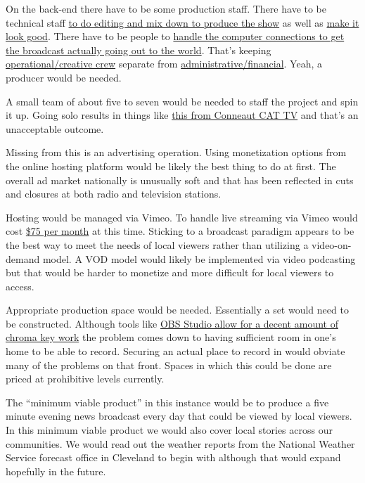 On the back-end there have to be some production staff. There have to be
technical staff
\href{https://en.wikipedia.org/w/index.php?title=Production_control_room&oldid=1087451141}{to
do editing and mix down to produce the show} as well as
\href{https://en.wikipedia.org/w/index.php?title=Broadcast_designer&oldid=1096142751}{make
it look good}. There have to be people to
\href{https://en.wikipedia.org/w/index.php?title=Transmission_control_room&oldid=1107297485}{handle
the computer connections to get the broadcast actually going out to the
world}. That's keeping
\href{https://en.wikipedia.org/w/index.php?title=Television_crew&oldid=1121314540}{operational/creative
crew} separate from
\href{https://en.wikipedia.org/w/index.php?title=Television_producer&oldid=1133167514}{administrative/financial}.
Yeah, a producer would be needed.

A small team of about five to seven would be needed to staff the project
and spin it up. Going solo results in things like
\href{https://vimeo.com/803474271}{this from Conneaut CAT TV} and that's
an unacceptable outcome.

Missing from this is an advertising operation. Using monetization
options from the online hosting platform would be likely the best thing
to do at first. The overall ad market nationally is unusually soft and
that has been reflected in cuts and closures at both radio and
television stations.

Hosting would be managed via Vimeo. To handle live streaming via Vimeo
would cost \href{https://vimeo.com/upgrade}{\$75 per month} at this
time. Sticking to a broadcast paradigm appears to be the best way to
meet the needs of local viewers rather than utilizing a video-on-demand
model. A VOD model would likely be implemented via video podcasting but
that would be harder to monetize and more difficult for local viewers to
access.

Appropriate production space would be needed. Essentially a set would
need to be constructed. Although tools like
\href{https://obsproject.com/kb/chroma-key-filter}{OBS Studio allow for
a decent amount of chroma key work} the problem comes down to having
sufficient room in one's home to be able to record. Securing an actual
place to record in would obviate many of the problems on that front.
Spaces in which this could be done are priced at prohibitive levels
currently.

The ``minimum viable product'' in this instance would be to produce a
five minute evening news broadcast every day that could be viewed by
local viewers. In this minimum viable product we would also cover local
stories across our communities. We would read out the weather reports
from the National Weather Service forecast office in Cleveland to begin
with although that would expand hopefully in the future.

